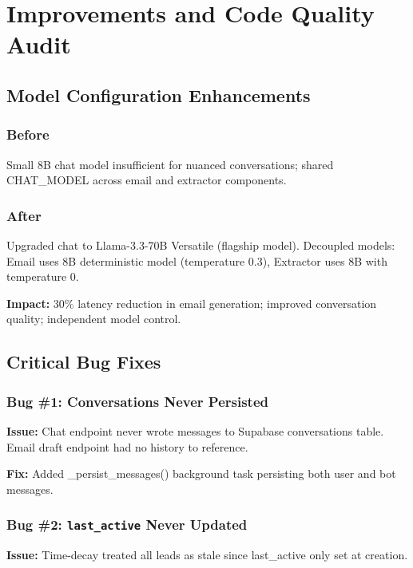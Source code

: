 \documentclass[10pt,twocolumn,a4paper]{article}
\begin{document}
\section{Improvements and Code Quality Audit}

\subsection{Model Configuration Enhancements}

\subsubsection{Before}

Small 8B chat model insufficient for nuanced conversations; shared CHAT\_MODEL across email and extractor components.

\subsubsection{After}

Upgraded chat to Llama-3.3-70B Versatile (flagship model). Decoupled models: Email uses 8B deterministic model (temperature 0.3), Extractor uses 8B with temperature 0.

\textbf{Impact:} 30\% latency reduction in email generation; improved conversation quality; independent model control.

\subsection{Critical Bug Fixes}

\subsubsection{Bug \#1: Conversations Never Persisted}

\textbf{Issue:} Chat endpoint never wrote messages to Supabase conversations table. Email draft endpoint had no history to reference.

\textbf{Fix:} Added \_persist\_messages() background task persisting both user and bot messages.

\subsubsection{Bug \#2: \texttt{last\_active} Never Updated}

\textbf{Issue:} Time-decay treated all leads as stale since last\_active only set at creation.
\end{document}
